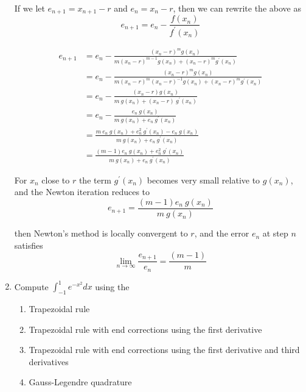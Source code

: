 \documentclass[a4paper,11pt]{report}
\begin{document}
\begin{enumerate}
    If we let $e_{n+1} = x_{n+1} - r$ and $e_{n} = x_{n} - r$, then we can 
    rewrite the above as
    \begin{equation*}
    e_{n+1} = e_{n} - \frac{f(x_{n})}{f^{\prime}(x_{n})}
    \end{equation*}

    \begin{equation*}
    \begin{aligned}
    e_{n+1} &= e_{n} - \frac{(x_{n} - r)^{m} g(x_{n})}{m(x_{n} - r)^{m-1} 
    g(x_{n}) + (x_{n} - r)^{m} g^{\prime}(x_{n})} \\
            &= e_{n} - \frac{(x_{n} - r)^{m} g(x_{n})}{m(x_{n} - r)^{m} 
    (x_{n} - r)^{-1} g(x_{n}) + (x_{n} - r)^{m} g^{\prime}(x_{n})} \\
            &= e_{n} - \frac{(x_{n} - r) g(x_{n})}{m\ g(x_{n}) + (x_{n} - r)\ 
    g^{\prime}(x_{n})} \\
            &= e_{n} - \frac{e_{n}\ g(x_{n})}{m\ g(x_{n}) + e_{n}\ g^{\prime}
    (x_{n})} \\
            &= \frac{m\ e_{n}\ g(x_{n}) + e_{n}^{2}\ g^{\prime}(x_{n}) - 
    e_{n}\ g(x_{n})}{m\ g(x_{n}) + e_{n}\ g^{\prime}(x_{n})} \\
            &= \frac{(m - 1)e_{n}\ g(x_{n}) + e_{n}^{2}\ g^{\prime}(x_{n})}
    {m\ g(x_{n}) + e_{n}\ g^{\prime}(x_{n})}
    \end{aligned}
    \end{equation*}
    
    For $x_{n}$ close to $r$ the term $g^{\prime}(x_{n})$ becomes very small 
    relative to $g(x_{n})$, and the Newton iteration reduces to
    \begin{equation*}
    e_{n+1} = \frac{(m-1)e_{n}\ g(x_{n})}{m\ g(x_{n})}
    \end{equation*}

    then Newton's method is locally convergent to $r$, and the error $e_{n}$ 
    at step $n$ satisfies
    \begin{equation*}
    \lim_{n \rightarrow \infty} \frac{e_{n+1}}{e_{n}} = \frac{(m-1)}{m}
    \end{equation*}


    \item Compute $\displaystyle \int_{-1}^{1} e^{-x^{2}} dx$ using the

    \begin{enumerate}
    \item Trapezoidal rule
    \item Trapezoidal rule with end corrections using the first derivative
    \item Trapezoidal rule with end corrections using the first derivative 
    and third derivatives
    \item Gauss-Legendre quadrature
    \end{enumerate}


\end{enumerate}
\end{document}
